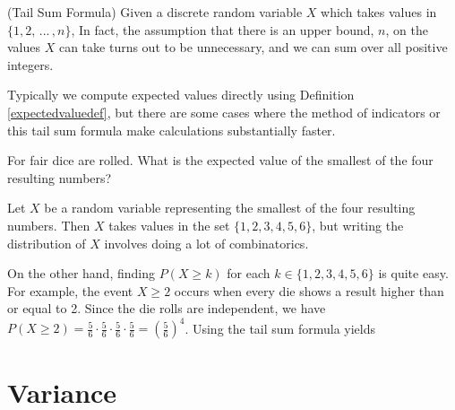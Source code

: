\begin{prop}\label{Discrete Tail Sum Formula}(Tail Sum Formula)
Given a discrete random variable $X$ which takes values in $\{1,2,\,...\,,n\}$,
In fact, the assumption that there is an upper bound, $n$, on the values $X$ can take turns out to be unnecessary, and we can sum over all positive integers.
\end{prop}
\par
Typically we compute expected values directly using Definition \ref{expectedvaluedef}, but there are some cases where the method of indicators or this tail sum formula make calculations substantially faster.
\begin{examp}
For fair dice are rolled. What is the expected value of the smallest of the four resulting numbers?
\par
\noindent Let $X$ be a random variable representing the smallest of the four resulting numbers. Then $X$ takes values in the set $\{1,2,3,4,5,6\}$, but writing the distribution of $X$ involves doing a lot of combinatorics. 
\par
\noindent On the other hand, finding $P(X \geq k)$ for each $k \in \{1,2,3,4,5,6\}$ is quite easy. For example, the event $X \geq 2$ occurs when every die shows a result higher than or equal to 2. Since the die rolls are independent, we have $P(X\geq2) = \frac{5}{6}\cdot\frac{5}{6}\cdot\frac{5}{6}\cdot \frac{5}{6} = (\frac{5}{6})^4$. Using the tail sum formula yields
\end{examp}

\section{Variance}

